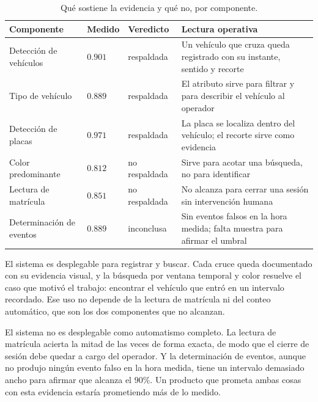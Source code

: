 \begin{table}[H]
    \centering
    \caption{Qué sostiene la evidencia y qué no, por componente.}
    \label{tab:alcance}
    \begin{tabular}{@{}p{} p{}
                    p{} p{}@{}}
        \toprule
        \textbf{Componente} & \textbf{Medido} & \textbf{Veredicto} &
        \textbf{Lectura operativa} \\
        \midrule
        Detección de vehículos & $0{.}901$ & respaldada &
        Un vehículo que cruza queda registrado con su instante, sentido y recorte \\
        Tipo de vehículo & $0{.}889$ & respaldada &
        El atributo sirve para filtrar y para describir el vehículo al operador \\
        Detección de placas & $0{.}971$ & respaldada &
        La placa se localiza dentro del vehículo; el recorte sirve como evidencia \\
        Color predominante & $0{.}812$ & no respaldada &
        Sirve para acotar una búsqueda, no para identificar \\
        Lectura de matrícula & $0{.}851$ & no respaldada &
        No alcanza para cerrar una sesión sin intervención humana \\
        Determinación de eventos & $0{.}889$ & inconclusa &
        Sin eventos falsos en la hora medida; falta muestra para afirmar el umbral \\
        \bottomrule
    \end{tabular}
\end{table}

El sistema es desplegable para registrar y buscar. Cada cruce queda documentado con
su evidencia visual, y la búsqueda por ventana temporal y color resuelve el caso que
motivó el trabajo: encontrar el vehículo que entró en un intervalo recordado. Ese
uso no depende de la lectura de matrícula ni del conteo automático, que son los dos
componentes que no alcanzan.

El sistema no es desplegable como automatismo completo. La lectura de matrícula
acierta la mitad de las veces de forma exacta, de modo que el cierre de sesión debe
quedar a cargo del operador. Y la determinación de eventos, aunque no produjo ningún
evento falso en la hora medida, tiene un intervalo demasiado ancho para afirmar que
alcanza el $90\%$. Un producto que prometa ambas cosas con esta evidencia estaría
prometiendo más de lo medido.

